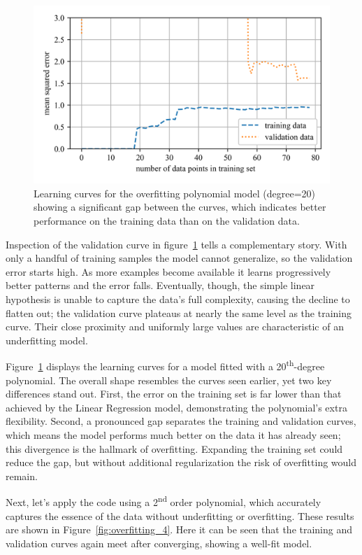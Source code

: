 \documentclass[12pt,letter]{article}
\begin{document}
\begin{figure}[H]
    \centering
    \includegraphics[]{../figures/overfitting_3.png}
    \caption{Learning curves for the overfitting polynomial model (degree=20) showing a significant gap between the curves, which indicates better performance on the training data than on the validation data.}
    \label{fig:overfitting_3}
\end{figure}

Inspection of the validation curve in figure~\ref{fig:overfitting_3}  tells a complementary story. With only a handful of training samples the model cannot generalize, so the validation error starts high. As more examples become available it learns progressively better patterns and the error falls. Eventually, though, the simple linear hypothesis is unable to capture the data's full complexity, causing the decline to flatten out; the validation curve plateaus at nearly the same level as the training curve. Their close proximity and uniformly large values are characteristic of an underfitting model.


Figure~\ref{fig:overfitting_3} displays the learning curves for a model fitted with a 20\textsuperscript{th}-degree polynomial. The overall shape resembles the curves seen earlier, yet two key differences stand out. First, the error on the training set is far lower than that achieved by the Linear Regression model, demonstrating the polynomial's extra flexibility. Second, a pronounced gap separates the training and validation curves, which means the model performs much better on the data it has already seen; this divergence is the hallmark of overfitting. Expanding the training set could reduce the gap, but without additional regularization the risk of overfitting would remain.


Next, let's apply the code using a 2\textsuperscript{nd} order polynomial, which accurately captures the essence of the data without underfitting or overfitting. These results are shown in Figure~\ref{fig:overfitting_4}. Here it can be seen that the training and validation curves again meet after converging, showing a well-fit model.
\end{document}
